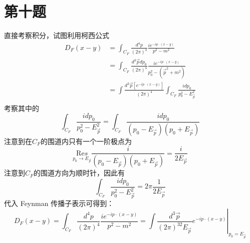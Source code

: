 \documentclass[a4paper]{ctexart}
\begin{document}
\section{第十题}
直接考察积分，试图利用柯西公式
$$
    \begin{aligned}
        D_F\left( x-y \right)
         & =\int_{C_F}{\frac{d^4p}{\left( 2\pi \right) ^4}
        \frac{ie^{-ip\cdot \left( x-y \right)}}{p^2-m^2}}                                                 \\
         & =\int_{C_F}{\frac{d^3\vec{p}dp_0}{\left( 2\pi \right) ^4}
        \frac{ie^{-ip\cdot \left( x-y \right)}}{p_0^2-\left( \vec{p}^2+m^2 \right)}}                      \\
         & =\int{\frac{d^3\vec{p}\left[ e^{-ip\cdot \left( x-y \right)} \right]}{\left( 2\pi \right) ^4}}
        \int_{C_F}{\frac{idp_0}{p_{0}^{2}-E_{\vec{p}}^{2}}}                                               \\
    \end{aligned}
$$
考察其中的
$$
    \int_{C_F}{\frac{idp_0}{p_{0}^{2}-E_{\vec{p}}^{2}}}=\int_{C_F}{\frac{idp_0}{\left( p_{0}-E_{\vec{p}} \right) \left( p_{0}+E_{\vec{p}} \right)}}
$$
注意到在$C_F$的围道内只有一个一阶极点为
$$
    \underset{p_0\rightarrow E_{\vec{p}}}{\text{Re}s}\frac{i}{\left( p_{0}-E_{\vec{p}} \right) \left( p_{0}+E_{\vec{p}} \right)}=\frac{i}{2E_{\vec{p}}}
$$
注意到$C_F$的围道方向为顺时针，因此有
$$
    \int_{C_F}{\frac{idp_0}{p_{0}^{2}-E_{\vec{p}}^{2}}}=2\pi \frac{1}{2E_{\vec{p}}}
$$
代入 Feynman 传播子表示可得到：
$$
    D_F\left( x-y \right) =\int_{C_F}{\frac{d^4p}{\left( 2\pi \right) ^4}\frac{ie^{-ip\cdot \left( x-y \right)}}{p^2-m^2}}=\left. \int{\frac{d^3\vec{p}}{\left( 2\pi \right) ^32E_{\vec{p}}}e^{-ip\cdot \left( x-y \right)}} \right|_{p_0=E_{\vec{p}}}
$$
\end{document}
